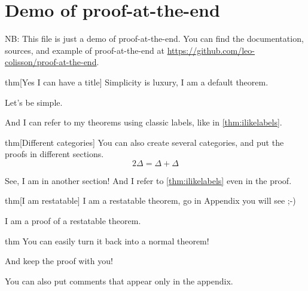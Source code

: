 \documentclass{article}
\begin{document}
\section{Demo of proof-at-the-end}

NB: This file is just a demo of proof-at-the-end.  You can find the documentation, sources, and example of proof-at-the-end at \url{https://github.com/leo-colisson/proof-at-the-end}.

\begin{theoremEnd}{thm}[Yes I can have a title]
  \label{thm:ilikelabels}
  Simplicity is luxury, I am a default theorem.
\end{theoremEnd}
\begin{proofEnd}
  Let's be simple.  
\end{proofEnd}

And I can refer to my theorems using classic labels, like in \autoref{thm:ilikelabels}.

\begin{theoremEnd}[category=greattheorem, end]{thm}[Different categories]
  You can also create several categories, and put the proofs in different sections.
  \[2\Delta = \Delta + \Delta\]
\end{theoremEnd}
\begin{proofEnd}
  See, I am in another section! And I refer to \autoref{thm:ilikelabels} even in the proof.
\end{proofEnd}

\begin{theoremEnd}[restate]{thm}[I am restatable]
  I am a restatable theorem, go in Appendix you will see ;-)
\end{theoremEnd}
\begin{proofEnd}
  I am a proof of a restatable theorem.  
\end{proofEnd}


\begin{theoremEnd}[normal]{thm}
  You can easily turn it back into a normal theorem!
\end{theoremEnd}
\begin{proofEnd}
  And keep the proof with you!  
\end{proofEnd}


You can also put comments that appear only in the appendix.

\end{document}
